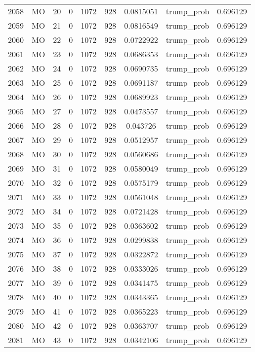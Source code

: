 \documentclass[12pt,a4paper]{article}
\begin{document}
\begin{tabular}{r|cccccccc}
	2058 & MO & 20 & 0 & 1072 & 928 & 0.0815051 & trump\_prob & 0.696129 \\
	2059 & MO & 21 & 0 & 1072 & 928 & 0.0816549 & trump\_prob & 0.696129 \\
	2060 & MO & 22 & 0 & 1072 & 928 & 0.0722922 & trump\_prob & 0.696129 \\
	2061 & MO & 23 & 0 & 1072 & 928 & 0.0686353 & trump\_prob & 0.696129 \\
	2062 & MO & 24 & 0 & 1072 & 928 & 0.0690735 & trump\_prob & 0.696129 \\
	2063 & MO & 25 & 0 & 1072 & 928 & 0.0691187 & trump\_prob & 0.696129 \\
	2064 & MO & 26 & 0 & 1072 & 928 & 0.0689923 & trump\_prob & 0.696129 \\
	2065 & MO & 27 & 0 & 1072 & 928 & 0.0473557 & trump\_prob & 0.696129 \\
	2066 & MO & 28 & 0 & 1072 & 928 & 0.043726 & trump\_prob & 0.696129 \\
	2067 & MO & 29 & 0 & 1072 & 928 & 0.0512957 & trump\_prob & 0.696129 \\
	2068 & MO & 30 & 0 & 1072 & 928 & 0.0560686 & trump\_prob & 0.696129 \\
	2069 & MO & 31 & 0 & 1072 & 928 & 0.0580049 & trump\_prob & 0.696129 \\
	2070 & MO & 32 & 0 & 1072 & 928 & 0.0575179 & trump\_prob & 0.696129 \\
	2071 & MO & 33 & 0 & 1072 & 928 & 0.0561048 & trump\_prob & 0.696129 \\
	2072 & MO & 34 & 0 & 1072 & 928 & 0.0721428 & trump\_prob & 0.696129 \\
	2073 & MO & 35 & 0 & 1072 & 928 & 0.0363602 & trump\_prob & 0.696129 \\
	2074 & MO & 36 & 0 & 1072 & 928 & 0.0299838 & trump\_prob & 0.696129 \\
	2075 & MO & 37 & 0 & 1072 & 928 & 0.0322872 & trump\_prob & 0.696129 \\
	2076 & MO & 38 & 0 & 1072 & 928 & 0.0333026 & trump\_prob & 0.696129 \\
	2077 & MO & 39 & 0 & 1072 & 928 & 0.0341475 & trump\_prob & 0.696129 \\
	2078 & MO & 40 & 0 & 1072 & 928 & 0.0343365 & trump\_prob & 0.696129 \\
	2079 & MO & 41 & 0 & 1072 & 928 & 0.0365223 & trump\_prob & 0.696129 \\
	2080 & MO & 42 & 0 & 1072 & 928 & 0.0363707 & trump\_prob & 0.696129 \\
	2081 & MO & 43 & 0 & 1072 & 928 & 0.0342106 & trump\_prob & 0.696129 \\

\end{tabular}
\end{document}
